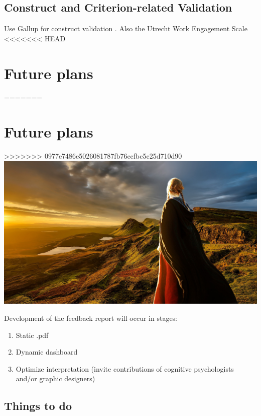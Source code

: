 \documentclass[
]{book}
\providecommand{\tightlist}{%
  \setlength{\itemsep}{0pt}\setlength{\parskip}{0pt}}
\begin{document}
\hypertarget{construct-and-criterion-related-validation}{%
\section{Construct and Criterion-related Validation}\label{construct-and-criterion-related-validation}}

Use Gallup for construct validation \citep{thackray_gallup_2005}. Also the Utrecht Work Engagement Scale \citep[UWES;][]{schaufeli_measurement_2002, schaufeli_defining_2010}
<<<<<<< HEAD

\hypertarget{future-plans}{%
\chapter{Future plans}\label{future-plans}}

=======

\hypertarget{future-plans}{%
\chapter{Future plans}\label{future-plans}}

>>>>>>> 0977e7486e5026081787fb76ccfbc5c25d710d90
\includegraphics{future.jpg}

Development of the feedback report will occur in stages:

\begin{enumerate}
\def\labelenumi{\arabic{enumi}.}
\tightlist
\item
  Static .pdf
\item
  Dynamic dashboard
\item
  Optimize interpretation (invite contributions of cognitive psychologists and/or graphic designers)
\end{enumerate}

\hypertarget{things-to-do}{%
\section{Things to do}\label{things-to-do}}
\end{document}
